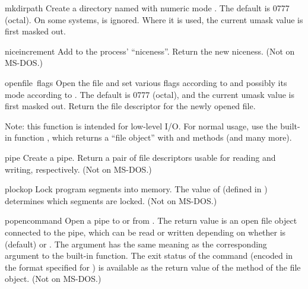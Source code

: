 \begin{funcdesc}{mkdir}{path}
Create a directory named  with numeric mode .
The default  is 0777 (octal).  On some systems, 
is ignored.  Where it is used, the current umask value is first
masked out.
\end{funcdesc}

\begin{funcdesc}{nice}{increment}
Add  to the process' ``niceness''.  Return the new niceness.
(Not on MS-DOS.)
\end{funcdesc}

\begin{funcdesc}{open}{file\, flags}
Open the file  and set various flags according to
 and possibly its mode according to .
The default  is 0777 (octal), and the current umask value is
first masked out.  Return the file descriptor for the newly opened
file.

Note: this function is intended for low-level I/O.  For normal usage,
use the built-in function , which returns a ``file object''
with  and   methods (and many more).
\end{funcdesc}

\begin{funcdesc}{pipe}{}
Create a pipe.  Return a pair of file descriptors 
usable for reading and writing, respectively.
(Not on MS-DOS.)
\end{funcdesc}

\begin{funcdesc}{plock}{op}
Lock program segments into memory.  The value of 
(defined in ) determines which segments are locked.
(Not on MS-DOS.)
\end{funcdesc}

\begin{funcdesc}{popen}{command}
Open a pipe to or from .  The return value is an open
file object connected to the pipe, which can be read or written
depending on whether  is  (default) or .
The  argument has the same meaning as the corresponding
argument to the built-in  function.  The exit status of
the command (encoded in the format specified for ) is
available as the return value of the  method of the file
object.
(Not on MS-DOS.)
\end{funcdesc}

